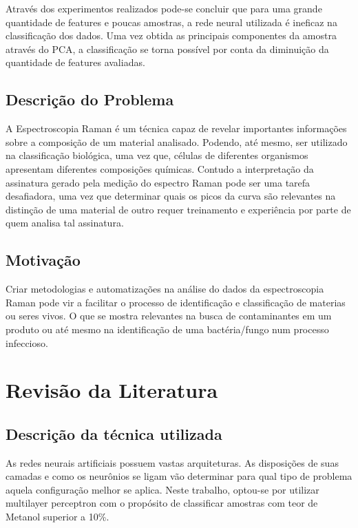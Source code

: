 \documentclass{article}
\begin{document}
Através dos experimentos realizados pode-se concluir que para uma grande quantidade de features e poucas amostras, a rede neural utilizada é ineficaz na classificação dos dados. Uma vez obtida as principais componentes da amostra através do PCA, a classificação se torna possível por conta da diminuição da quantidade de features avaliadas.

\vspace{1cm}
\subsection{Descrição do Problema}
\vspace{1cm} A Espectroscopia Raman é um técnica capaz de revelar importantes informações sobre a composição de um material analisado. Podendo, até mesmo, ser utilizado na classificação biológica, uma vez que, células de diferentes organismos apresentam diferentes composições químicas.
Contudo a interpretação da assinatura gerado pela medição do espectro Raman pode ser uma tarefa desafiadora, uma vez que determinar quais os picos da curva são relevantes na distinção de uma material de outro requer treinamento e experiência por parte de quem analisa tal assinatura.

\subsection{Motivação}
\vspace{1cm} Criar metodologias e automatizações na análise do dados da espectroscopia Raman pode vir a facilitar o processo de identificação e classificação de materias ou seres vivos. O que se mostra relevantes na busca de contaminantes em um produto ou até mesmo na identificação de uma bactéria/fungo num processo infeccioso.

\vspace{1cm}
\section{Revisão da Literatura}
\vspace{1cm}
\subsection{Descrição da técnica utilizada}
\vspace{1cm} As redes neurais artificiais possuem vastas arquiteturas. As disposições de suas camadas e como os neurônios se ligam vão determinar para qual tipo de problema aquela configuração melhor se aplica. Neste trabalho, optou-se por utilizar multilayer perceptron com o propósito de classificar amostras com teor de Metanol superior a 10\%.
\end{document}
